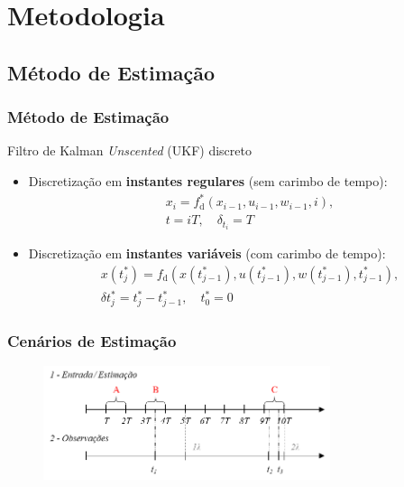 \documentclass{beamer}
\renewcommand{\(}{\left(}
\renewcommand{\)}{\right)}
\renewcommand{\[}{\left[}
\renewcommand{\]}{\right]}
\begin{document}

\section{Metodologia} 

\subsection{Método de Estimação}


\begin{frame}
	\frametitle{Método de Estimação}
	
	Filtro de Kalman \textit{Unscented} (UKF) discreto \autocite{Julier2004}
	
	\vspace{0.25cm}
	\begin{itemize}
		\item Discretização em \textbf{instantes regulares} (sem carimbo de tempo):
		\hfill
		\begin{align*}
		&x_i=f^*_{\textrm{d}}(x_{i-1},u_{i-1},w_{i-1},i),\\
		&t=iT, \quad \delta_{t_i} = T
		\end{align*}
		\vspace{0.15cm}
		\item Discretização em \textbf{instantes variáveis} (com carimbo de tempo):
		\begin{align*}
		&x(t^*_j)=f_{\textrm{d}}(x(t^*_{j-1}),u(t^*_{j-1}),w(t^*_{j-1}),t^*_{j-1}),\\
		&\delta t^*_j = t^*_j - t^*_{j-1} , \quad  t^*_0=0
		\end{align*}
		
	\end{itemize}


\end{frame}


\begin{frame}
	\frametitle{Cenários de Estimação}
	
	\begin{figure}
		\centering
		\includegraphics[width=0.75\textwidth]{images/cenarios-est.png}
	\end{figure}
	

\end{frame}
\end{document}
